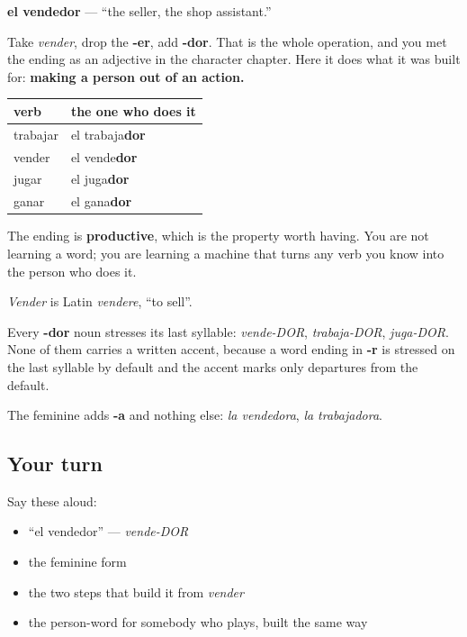 \begin{cousinweb}
\textbf{el vendedor} — \textquotedblleft{}the seller, the shop assistant.\textquotedblright{}

Take \emph{vender}, drop the \textbf{-er}, add \textbf{-dor}. That is the whole operation, and you met the ending as an adjective in the character chapter. Here it does what it was built for: \textbf{making a person out of an action.}

\noindent
\begin{tabularx}{\linewidth}{@{}>{\raggedright\arraybackslash}X>{\raggedright\arraybackslash}X@{}}
\toprule
\textbf{verb} & \textbf{the one who does it} \\
\midrule
trabajar & el trabaja\textbf{dor} \\
vender & el vende\textbf{dor} \\
jugar & el juga\textbf{dor} \\
ganar & el gana\textbf{dor} \\
\bottomrule
\end{tabularx}

The ending is \textbf{productive}, which is the property worth having. You are not learning a word; you are learning a machine that turns any verb you know into the person who does it.

\emph{Vender} is Latin \emph{vendere}, \textquotedblleft{}to sell\textquotedblright{}.
\end{cousinweb}

\begin{grammarlens}[title={Grammar Lens: where the ending puts the stress}]
Every \textbf{-dor} noun stresses its last syllable: \emph{vende-DOR}, \emph{trabaja-DOR}, \emph{juga-DOR}. None of them carries a written accent, because a word ending in \textbf{-r} is stressed on the last syllable by default and the accent marks only departures from the default.

The feminine adds \textbf{-a} and nothing else: \emph{la vendedora}, \emph{la trabajadora}.
\end{grammarlens}

\subsection*{Your turn}
Say these aloud:

\begin{itemize}
\raggedright
  \item \textquotedblleft{}el vendedor\textquotedblright{} — \emph{vende-DOR}
  \item the feminine form
  \item the two steps that build it from \emph{vender}
  \item the person-word for somebody who plays, built the same way
\end{itemize}

